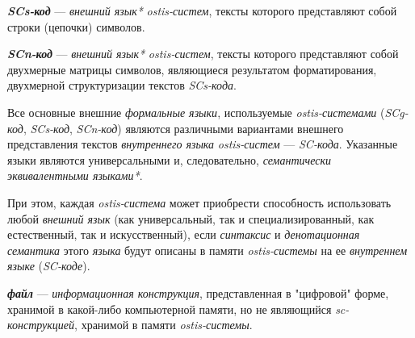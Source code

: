 \textbf{\textit{SCs-код}} --- \textit{внешний язык*} \textit{ostis-систем}, тексты которого представляют собой строки (цепочки) символов.

\begin{SCn}

    \begin{scnindent}
    \end{scnindent}

\end{SCn}

\textbf{\textit{SCn-код}} --- \textit{внешний язык*} \textit{ostis-систем}, тексты которого представляют собой двухмерные матрицы символов, являющиеся результатом форматирования, двухмерной структуризации текстов \textit{SCs-кода}.

\begin{SCn}

    \begin{scnindent}
    \end{scnindent}

\end{SCn}

Все основные внешние \textit{формальные языки}, используемые \textit{ostis-системами} (\textit{SCg-код}, \textit{SCs-код}, \textit{SCn-код}) являются различными вариантами внешнего представления текстов \textit{внутреннего языка} \textit{ostis-систем} --- \textit{SC-кода}.
Указанные языки являются универсальными и, следовательно, \textit{семантически эквивалентными языками*}.

При этом, каждая \textit{ostis-система} может приобрести способность использовать любой \textit{внешний язык} (как универсальный, так и специализированный, как естественный, так и искусственный), если \textit{синтаксис} и \textit{денотационная семантика} этого \textit{языка} будут описаны в памяти \textit{ostis-системы} на ее \textit{внутреннем языке} (\textit{SC-коде}).

\textbf{\textit{файл}} --- \textit{информационная конструкция}, представленная в "цифровой" форме, хранимой в какой-либо компьютерной памяти, но не являющийся \textit{sc-конструкцией}, хранимой в памяти \textit{ostis-системы}.

